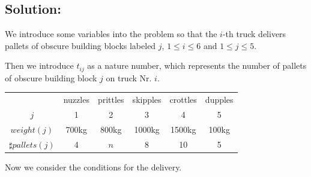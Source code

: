 \documentclass[11pt]{article}
\begin{document}
\vspace{4mm}

\subsection*{Solution:}

We introduce some variables into the problem so that the $i$-th truck delivers pallets of obscure building blocks labeled $j$, $1\leq i \leq6$ and $1\leq j \leq5$.

Then we introduce $t_{ij}$ as a nature number, which represents the number of pallets of obscure building block $j$ on truck Nr. $i$.
\begin{center}
\begin{tabular}{|c|c|c|c|c|c|}
  \hline
    & nuzzles & prittles & skipples & crottles & dupples \\
  $j$ & 1 & 2 & 3 & 4 & 5 \\
  $weight(j)$ & 700kg & 800kg & 1000kg & 1500kg & 100kg \\
  $\sharp pallets(j)$ & 4 & $n$ & 8 & 10 & 5 \\
  \hline
\end{tabular}
\end{center}

Now we consider the conditions for the delivery.
\end{document}
